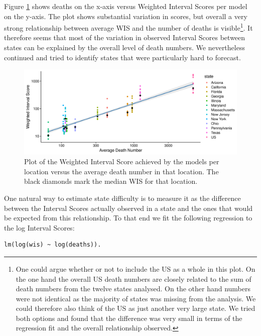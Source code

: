 \documentclass[
]{book}
\begin{document}
Figure \ref{fig:wis-deaths} shows deaths on the x-axis versus Weighted Interval Scores per model on the y-axis. The plot shows substantial variation in scores, but overall a very strong relationship between average WIS and the number of deaths is visible\footnote{One could argue whether or not to include the US as a whole in this plot. On the one hand the overall US death numbers are closely related to the sum of death numbers from the twelve states analysed. On the other hand numbers were not identical as the majority of states was missing from the analysis. We could therefore also think of the US as just another very large state. We tried both options and found that the difference was very small in terms of the regression fit and the overall relationship observed.}. It therefore seems that most of the variation in observed Interval Scores between states can be explained by the overall level of death numbers. We nevertheless continued and tried to identify states that were particularly hard to forecast.

\begin{figure}
\includegraphics[width=1\linewidth]{../visualisation/chapter-5-results/scenario-baseline/wis-vs-deaths} \caption{Plot of the Weighted Interval Score achieved by the models per location versus the average death number in that location. The black diamonds mark the median WIS for that location.}\label{fig:wis-deaths}
\end{figure}

One natural way to estimate state difficulty is to measure it as the difference between the Interval Scores actually observed in a state and the ones that would be expected from this relationship. To that end we fit the following regression to the log Interval Scores:

\begin{verbatim}
lm(log(wis) ~ log(deaths)).
\end{verbatim}
\end{document}
